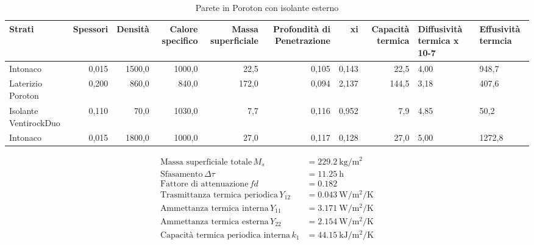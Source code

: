 \begin{table}
\centering
\caption{Parete in Poroton con isolante esterno}
\begin{tabular}{lrrrrrrr}
\toprule
                Strati & Spessori & Densità & Calore specifico & Massa superficiale & Profondità di Penetrazione &     xi & Capacità termica & Diffusività termica x 10-7 & Effusività termcia \\
\midrule
              Intonaco &    0,015 &  1500,0 &           1000,0 &               22,5 &                      0,105 &  0,143 &             22,5 &                       4,00 &              948,7 \\
     Laterizio Poroton &    0,200 &   860,0 &            840,0 &              172,0 &                      0,094 &  2,137 &            144,5 &                       3,18 &              407,6 \\
 Isolante VentirockDuo &    0,110 &    70,0 &           1030,0 &                7,7 &                      0,116 &  0,952 &              7,9 &                       4,85 &               50,2 \\
              Intonaco &    0,015 &  1800,0 &           1000,0 &               27,0 &                      0,117 &  0,128 &             27,0 &                       5,00 &             1272,8 \\
\bottomrule
\end{tabular}
\end{table}

\begin{flushleft}
\begin{align*}
\text{Massa superficiale totale} \, M_s &= \SI{229.2}{\kilo\gram\per\metre\squared}\\
\text{Sfasamento} \, \Delta\tau &= \SI{11.25}{\hour}\\
\text{Fattore di attenuazione} \, fd &= \SI{0.182}{}\\
\text{Trasmittanza termica periodica} \, Y_{12} &= \SI{0.043}{\watt\per\metre\squared\per\kelvin}\\
\text{Ammettanza termica interna} \, Y_{11} &= \SI{3.171}{\watt\per\metre\squared\per\kelvin}\\
\text{Ammettanza termica esterna} \, Y_{22} &= \SI{2.154}{\watt\per\metre\squared\per\kelvin}\\
\text{Capacità termica periodica interna} \, k_1 &= \SI{44.15}{\kilo\joule\per\metre\squared\per\kelvin}\\
\end{align*}
\end{flushleft}
